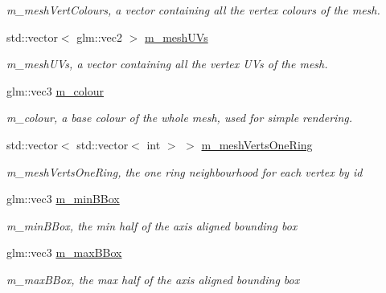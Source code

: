 \begin{DoxyCompactItemize}
\begin{DoxyCompactList}\small\item\em m\+\_\+mesh\+Vert\+Colours, a vector containing all the vertex colours of the mesh. \end{DoxyCompactList}\item 
std\+::vector$<$ glm\+::vec2 $>$ \hyperlink{classMesh_af7ceb87d2dcde9aff06e0b986de9640e}{m\+\_\+mesh\+U\+Vs}\hypertarget{classMesh_af7ceb87d2dcde9aff06e0b986de9640e}{}\label{classMesh_af7ceb87d2dcde9aff06e0b986de9640e}

\begin{DoxyCompactList}\small\item\em m\+\_\+mesh\+U\+Vs, a vector containing all the vertex UV\textquotesingle{}s of the mesh. \end{DoxyCompactList}\item 
glm\+::vec3 \hyperlink{classMesh_a4778512cc7163a50aad277ff4f6b8ec8}{m\+\_\+colour}\hypertarget{classMesh_a4778512cc7163a50aad277ff4f6b8ec8}{}\label{classMesh_a4778512cc7163a50aad277ff4f6b8ec8}

\begin{DoxyCompactList}\small\item\em m\+\_\+colour, a base colour of the whole mesh, used for simple rendering. \end{DoxyCompactList}\item 
std\+::vector$<$ std\+::vector$<$ int $>$ $>$ \hyperlink{classMesh_a80d54fe600d1a19d40315d6f0d4d42f1}{m\+\_\+mesh\+Verts\+One\+Ring}\hypertarget{classMesh_a80d54fe600d1a19d40315d6f0d4d42f1}{}\label{classMesh_a80d54fe600d1a19d40315d6f0d4d42f1}

\begin{DoxyCompactList}\small\item\em m\+\_\+mesh\+Verts\+One\+Ring, the one ring neighbourhood for each vertex by id \end{DoxyCompactList}\item 
glm\+::vec3 \hyperlink{classMesh_a4d45309b6e6500312ebfc4e9ac44a477}{m\+\_\+min\+B\+Box}\hypertarget{classMesh_a4d45309b6e6500312ebfc4e9ac44a477}{}\label{classMesh_a4d45309b6e6500312ebfc4e9ac44a477}

\begin{DoxyCompactList}\small\item\em m\+\_\+min\+B\+Box, the min half of the axis aligned bounding box \end{DoxyCompactList}\item 
glm\+::vec3 \hyperlink{classMesh_ad6f161331138fbf12fce54efd5c0a212}{m\+\_\+max\+B\+Box}\hypertarget{classMesh_ad6f161331138fbf12fce54efd5c0a212}{}\label{classMesh_ad6f161331138fbf12fce54efd5c0a212}

\begin{DoxyCompactList}\small\item\em m\+\_\+max\+B\+Box, the max half of the axis aligned bounding box \end{DoxyCompactList}\end{DoxyCompactItemize}


